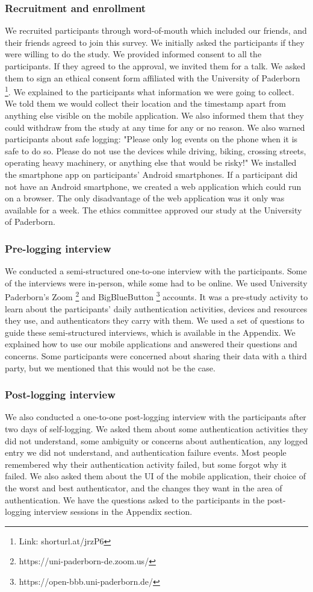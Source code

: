\subsubsection{Recruitment and enrollment}
We recruited participants through word-of-mouth which included our friends, and their friends agreed to join this survey. We initially asked the participants if they were willing to do the study. We provided informed consent to all the participants. If they agreed to the approval, we invited them for a talk. We asked them to sign an ethical consent form affiliated with the University of Paderborn%
\footnote{Link: shorturl.at/jrzP6}. We explained to the participants what information we were going to collect. We told them we would collect their location and the timestamp apart from anything else visible on the mobile application. We also informed them that they could withdraw from the study at any time for any or no reason. We also warned participants about safe logging: "Please only log events on the phone when it is safe to do so. Please do not use the devices while driving, biking, crossing streets, operating heavy machinery, or anything else that would be risky!" 
We installed the smartphone app on participants' Android smartphones. If a participant did not have an Android smartphone, we created a web application which could run on a browser. The only disadvantage of the web application was it only was available for a week. The ethics committee approved our study at the University of Paderborn.
\subsubsection{Pre-logging interview}
We conducted a semi-structured one-to-one interview with the participants. Some of the interviews were in-person, while some had to be online. We used University Paderborn's Zoom%
\footnote{https://uni-paderborn-de.zoom.us/} and BigBlueButton%
\footnote{https://open-bbb.uni-paderborn.de/} accounts. It was a pre-study activity to learn about the participants' daily authentication activities, devices and resources they use, and authenticators they carry with them. We used a set of questions to guide these semi-structured interviews, which is available in the Appendix. We explained how to use our mobile applications and answered their questions and concerns. Some participants were concerned about sharing their data with a third party, but we mentioned that this would not be the case. 
\subsubsection{Post-logging interview}
We also conducted a one-to-one post-logging interview with the participants after two days of self-logging. We asked them about some authentication activities they did not understand, some ambiguity or concerns about authentication, any logged entry we did not understand, and authentication failure events. Most people remembered why their authentication activity failed, but some forgot why it failed. We also asked them about the UI of the mobile application, their choice of the worst and best authenticator, and the changes they want in the area of authentication.  We have the questions asked to the participants in the post-logging interview sessions in the Appendix section. 
